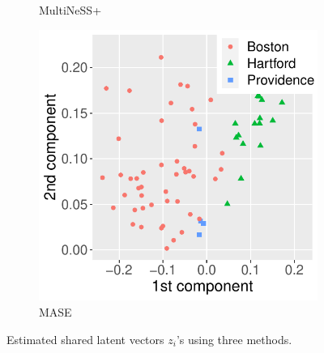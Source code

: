 \documentclass[12pt]{article}
\begin{document}
\begin{figure}
\begin{subfigure}{0.28\textwidth}
    \caption{MultiNeSS+}
\end{subfigure}\quad 
\begin{subfigure}{0.28\textwidth}
	\centering
	\includegraphics[width=1\linewidth]{Figures/Lawc_Z.pdf}
    \caption{MASE}
\end{subfigure}
\caption{Estimated shared latent vectors $z_i$'s  using three methods.} 
\label{fig:Z}
\end{figure}
\end{document}
